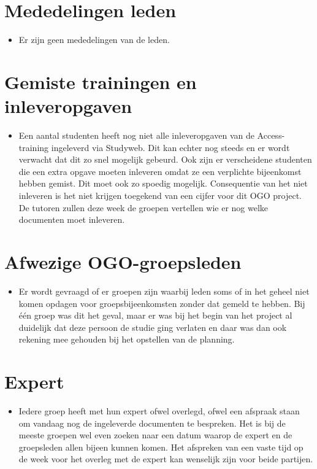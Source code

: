 \documentclass[]{article}
\begin{document}
\section{Mededelingen leden}

  \begin{itemize}
    \item Er zijn geen mededelingen van de leden.
  \end{itemize}

\section{Gemiste trainingen en inleveropgaven}

  \begin{itemize}
    \item Een aantal studenten heeft nog niet alle inleveropgaven van de Access-training ingeleverd via Studyweb. Dit kan echter nog steeds en er wordt verwacht dat dit zo snel mogelijk gebeurd. Ook zijn er verscheidene studenten die een extra opgave moeten inleveren omdat ze een verplichte bijeenkomst hebben gemist. Dit moet ook zo spoedig mogelijk. Consequentie van het niet inleveren is het niet krijgen toegekend van een cijfer voor dit OGO project. De tutoren zullen deze week de groepen vertellen wie er nog welke documenten moet inleveren.
  \end{itemize}

\section{Afwezige OGO-groepsleden}

  \begin{itemize}
    \item Er wordt gevraagd of er groepen zijn waarbij leden soms of in het geheel niet komen opdagen voor groepsbijeenkomsten zonder dat gemeld te hebben. Bij \'e\'en groep was dit het geval, maar er was bij het begin van het project al duidelijk dat deze persoon de studie ging verlaten en daar was dan ook rekening mee gehouden bij het opstellen van de planning.
  \end{itemize}

\section{Expert}

  \begin{itemize}
    \item Iedere groep heeft met hun expert ofwel overlegd, ofwel een afspraak staan om vandaag nog de ingeleverde documenten te bespreken. Het is bij de meeste groepen wel even zoeken naar een datum waarop de expert en de groepsleden allen bijeen kunnen komen. Het afspreken van een vaste tijd op de week voor het overleg met de expert kan wenselijk zijn voor beide partijen.
  \end{itemize}
\end{document}
